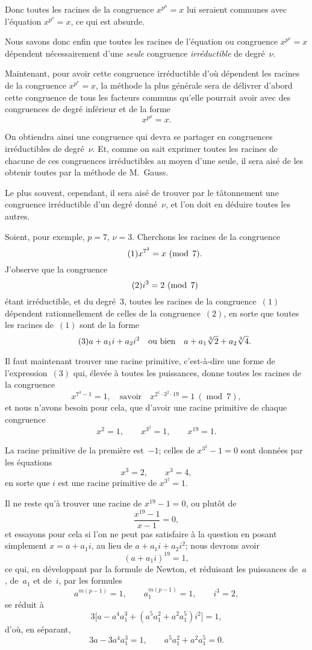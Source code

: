 \documentclass[leqno,12pt]{book}[2005/09/16]
\newcommand{\Eq}[1]{\ensuremath{#1}}
\newcommand{\Tag}[1]{\tag*{\ensuremath{#1}}}
\DeclareMathOperator{\Mod}{mod\;}
\renewcommand{\mod}{\Mod}
\begin{document}
Donc toutes les racines de la congruence $x^{p^{\mu}}\! = x$ lui seraient
communes avec l'équation $x^{p^{\nu}}\! = x$, ce qui est absurde.

Nous savons donc enfin que toutes les racines de l'équation ou
congruence $x^{p^{\nu}}\! = x$ dépendent nécessairement d'une \emph{seule} congruence
\emph{irréductible} de degré~$\nu$.

Maintenant, pour avoir cette congruence irréductible d'où
dépendent les racines de la congruence $x^{p^{\nu}}\! = x$, la méthode la
plus générale sera de délivrer d'abord cette congruence de tous
les facteurs communs qu'elle pourrait avoir avec des congruences
de degré inférieur et de la forme
\[
x^{p^{\mu}}\! = x.
\]

On obtiendra ainsi une congruence qui devra se partager en
congruences irréductibles de degré~$\nu$. Et, comme on sait exprimer
toutes les racines de chacune de ces congruences irréductibles au
moyen d'une seule, il sera aisé de les obtenir toutes par la méthode
de M.~Gauss.

Le plus souvent, cependant, il sera aisé de trouver par le tâtonnement
une congruence irréductible d'un degré donné~$\nu$, et l'on
doit en déduire toutes les autres.

Soient, pour exemple, $p = 7$, $\nu = 3$. Cherchons les racines de
la congruence
\[
\Tag{(1)}
x^{7^{3}} = x\ (\mod 7).
\]
J'observe que la congruence
\[
\Tag{(2)}
i^{3} = 2\ (\mod 7)
\]
étant irréductible, et du degré~$3$, toutes les racines de la congruence~\Eq{(1)}
dépendent rationnellement de celles de la congruence~\Eq{(2)},
en sorte que toutes les racines de~\Eq{(1)} sont de la
forme
\[
\Tag{(3)}
a + a_{1} i + a_{2} i^{2} \quad\text{ou bien}\quad
a + a_{1} \sqrt[3]{2} + a_{2} \sqrt[3]{4}.
\]

Il faut maintenant trouver une racine primitive, c'est-à-dire une
forme de l'expression~\Eq{(3)} qui, élevée à toutes les puissances,
donne toutes les racines de la congruence
\[
x^{7^{3}-1} = 1, \quad\text{savoir}\quad
x^{2^{1} · 3^{2} · 19} = 1\ (\mod 7),
\]
et nous n'avons besoin pour cela, que d'avoir une racine primitive
de chaque congruence
\[
x^{2} = 1,\qquad
x^{3^{2}} = 1,\qquad
x^{19} = 1.
\]

La racine primitive de la première est~$-1$; celles de $x^{3^{2}} - 1 = 0$
sont données par les équations
\[
x^{3} = 2,\qquad
x^{3} = 4,
\]
en sorte que $i$ est une racine primitive de $x^{3^{2}} = 1$.

Il ne reste qu'à trouver une racine de $x^{19} - 1 = 0$, ou plutôt de
\[
\frac{x^{19} - 1}{x - 1} = 0,
\]
et essayons pour cela si l'on ne peut pas satisfaire à la question
en posant simplement $x = a + a_{1} i$, au lieu de $a + a_{1} i + a_{2} i^{2}$;
nous devrons avoir
\[
(a + a_{1} i)^{19} = 1,
\]
ce qui, en développant par la formule de Newton, et réduisant les
puissances de~$a$, de~$a_{1}$ et de~$i$, par les formules
\[
a^{m(p-1)} = 1, \qquad
a_{1}^{m(p-1)} = 1, \qquad
i^{3} = 2,
\]
se réduit à
\[
3 \bigl[a - a^{4} a_{1}^{3} + (a^{5} a_{1}^{2} + a^{2} a_{1}^{5}) i^{2} \bigr] = 1,
\]
d'où, en séparant,
\[
3a - 3a^{4} a_{1}^{3} = 1, \qquad
a^{5} a_{1}^{2} + a^{2} a_{1}^{5} = 0.
\]
\end{document}
